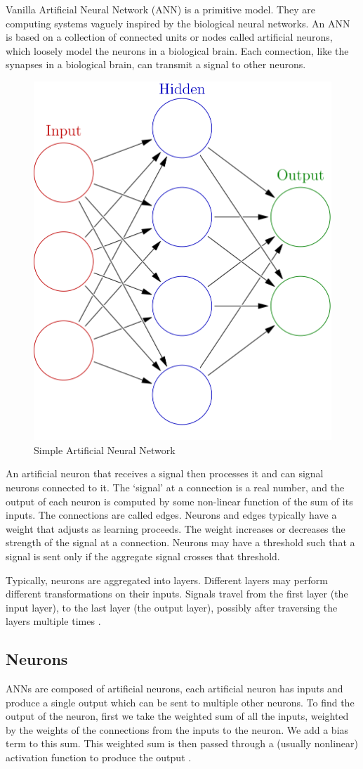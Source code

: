 \documentclass[12pt, a4paper]{report}
\begin{document}
\hspace{0.5cm} Vanilla Artificial Neural Network (ANN) is a primitive model. They are computing systems vaguely inspired by the biological neural networks. An ANN is based on a collection of connected units or nodes called artificial neurons, which loosely model the neurons in a biological brain. Each connection, like the synapses in a biological brain, can transmit a signal to other neurons.

\begin{figure}[!htbp]
    \centering
    \includegraphics[height=0.5\textwidth]{artificial_neural_network.png}
    \caption[Simple Artificial Neural Network]{Simple Artificial Neural Network \cite{wiki:anns}}
    \label{fig:5.1}
\end{figure}

An artificial neuron that receives a signal then processes it and can signal neurons connected to it. The `signal' at a connection is a real number, and the output of each neuron is computed by some non-linear function of the sum of its inputs. The connections are called edges. Neurons and edges typically have a weight that adjusts as learning proceeds. The weight increases or decreases the strength of the signal at a connection. Neurons may have a threshold such that a signal is sent only if the aggregate signal crosses that threshold.

Typically, neurons are aggregated into layers. Different layers may perform different transformations on their inputs. Signals travel from the first layer (the input layer), to the last layer (the output layer), possibly after traversing the layers multiple times \cite{wiki:anns}.

\subsection{Neurons}
\label{subsec:neurons}
ANNs are composed of artificial neurons, each artificial neuron has inputs and produce a single output which can be sent to multiple other neurons. To find the output of the neuron, first we take the weighted sum of all the inputs, weighted by the weights of the connections from the inputs to the neuron. We add a bias term to this sum. This weighted sum is then passed through a (usually nonlinear) activation function to produce the output \cite{wiki:anns}.
\end{document}
